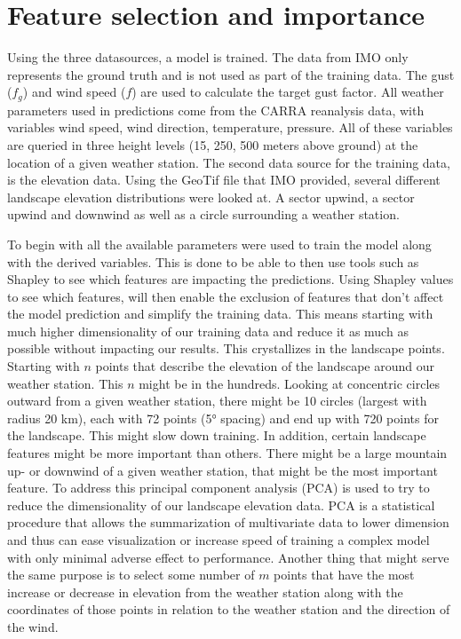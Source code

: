 \section{Feature selection and importance}
Using the three datasources, a model is trained. The data from IMO only represents the ground truth and is not used as part of the training data. The gust ($f_g$) and wind speed ($f$) are used to calculate the target gust factor. All weather parameters used in predictions come from the CARRA reanalysis data, with variables wind speed, wind direction, temperature, pressure. All of these variables are queried in three height levels (15, 250, 500 meters above ground) at the location of a given weather station. The second data source for the training data, is the elevation data. Using the GeoTif file that IMO provided, several different landscape elevation distributions were looked at. A sector upwind, a sector upwind and downwind as well as a circle surrounding a weather station.

To begin with all the available parameters were used to train the model along with the derived variables. This is done to be able to then use tools such as Shapley to see which features are impacting the predictions. Using Shapley values to see which features, will then enable the exclusion of features that don't affect the model prediction and simplify the training data. This means starting with much higher dimensionality of our training data and reduce it as much as possible without impacting our results. This crystallizes in the landscape points. Starting with $n$ points that describe the elevation of the landscape around our weather station. This $n$ might be in the hundreds. Looking at concentric circles outward from a given weather station, there might be 10 circles (largest with radius 20 km), each with 72 points (5° spacing) and end up with 720 points for the landscape. This might slow down training. In addition, certain landscape features might be more important than others. There might be a large mountain up- or downwind of a given weather station, that might be the most important feature. To address this principal component analysis (PCA) is used to try to reduce the dimensionality of our landscape elevation data. PCA is a statistical procedure that allows the summarization of multivariate data to lower dimension and thus can ease visualization or increase speed of training a complex model with only minimal adverse effect to performance\cite{pca_information}. Another thing that might serve the same purpose is to select some number of $m$ points that have the most increase or decrease in elevation from the weather station along with the coordinates of those points in relation to the weather station and the direction of the wind.

